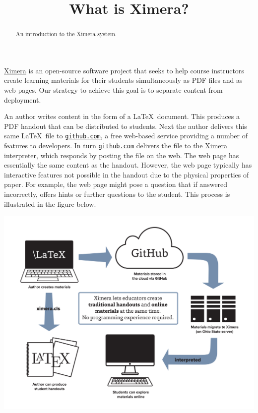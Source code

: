 \documentclass{ximera}
\title{What is Ximera?}
\begin{document}
\begin{abstract}
An introduction to the Ximera system.
\end{abstract}
\maketitle

\href{http://ximera.osu.edu}{\sf Ximera}
is an open-source software project that
seeks to help course instructors create learning materials
for their students simultaneously as PDF files and as web pages.
Our strategy to achieve this goal is to separate
content from deployment.

An author writes content in the form of a \LaTeX\ document.
This produces a PDF handout that can be distributed to students.
Next the author delivers this same \LaTeX\ file to
\href{http://github.com}{\tt github.com},
a free web-based service providing a number of features to developers.
In turn \href{http://github.com}{\tt github.com} delivers
the file to the \href{http://ximera.osu.edu}{\sf Ximera}
interpreter, which responds by posting the file on the web.
The web page has essentially the same content as the handout.
However, the web page typically has interactive features
not possible in the handout due to the physical properties of paper.
For example, the web page might pose a question
that if answered incorrectly, offers hints or further questions
to the student.
This process is illustrated in the figure below.

\begin{image}
\includegraphics[scale=.25]{XimeraGraphic.png}
\end{image}
\end{document}
